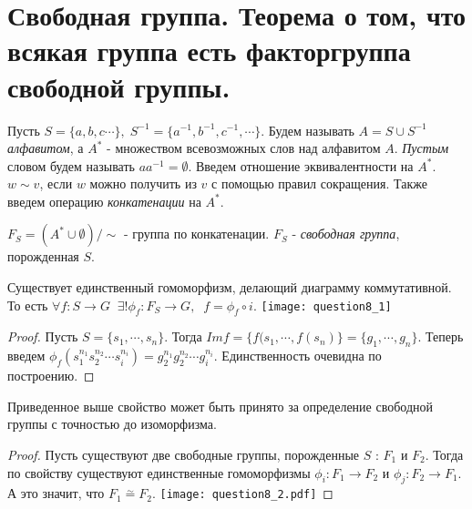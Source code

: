 \section{Свободная группа. Теорема о том, что всякая группа есть факторгруппа свободной группы.}

Пусть $ S = \{ a, b, c \cdots \}, \; S^{-1} = \{ a^{-1}, b^{-1}, c^{-1}, \cdots \} $. 
Будем называть $ A = S \cup S^{-1} $ \emph{алфавитом}, а $ A^{*} $ - множеством всевозможных слов над алфавитом $ A $.
\emph{Пустым} словом будем называть $ aa^{-1} = \emptyset $. Введем отношение эквивалентности на $ A^{*} $. $ w \sim v $, если 
$ w $ можно получить из $ v $ с помощью правил сокращения. Также введем операцию \emph{конкатенации} на $ A^{*} $.

\begin{defn}
  $ F_{S} = (A^{*} \cup \emptyset )/\!\!\!\sim $ - группа по конкатенации. 
  $ F_{S} $ - \emph{свободная группа}, порожденная $ S $.
\end{defn}

\begin{thm}
  Существует единственный гомоморфизм, делающий диаграмму коммутативной. 
  То есть $ \forall f : S \rightarrow G \;\; \exists ! \phi_{f} : F_{S} \rightarrow G, \;\; f = \phi_{f} \circ i $. \newline
  \texttt{[image: question8\_1]}
\end{thm}
\begin{proof}
  Пусть $ S = \{ s_{1}, \cdots, s_{n} \} $. Тогда $ Im f = \{ f(s_{1}, \cdots, f(s_{n}) \} = \{ g_{1}, \cdots, g_{n} \} $. Теперь
  введем $ \phi_{f}(s_{1}^{n_{1}}s_{2}^{n_{2}}\cdots s_{i}^{n_{i}}) = g_{2}^{n_{1}}g_{2}^{n_{2}}\cdots g_{i}^{n_{i}} $. Единственность
  очевидна по построению.
\end{proof}

\begin{thm}
  Приведенное выше свойство может быть принято за определение свободной группы с точностью до изоморфизма.
\end{thm}
\begin{proof}
  Пусть существуют две свободные группы, порожденные $ S $ : $ F_{1} $ и $ F_{2} $. Тогда по свойству
  существуют единственные гомоморфизмы $ \phi_{i} : F_{1} \rightarrow F_{2} $ и $ \phi_{j} : F_{2} \rightarrow F_{1} $. А это значит, что
  $ F_{1} \overset\sim{=} F_{2} $. \newline
  \texttt{[image: question8\_2.pdf]}
\end{proof}


